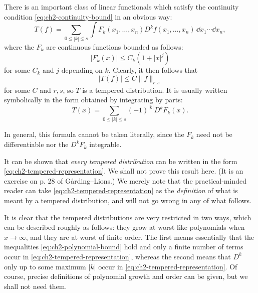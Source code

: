 There is an important class of linear functionals which satisfy the continuity
condition \eqref{eq:ch2-continuity-bound} in an obvious way:
\begin{equation}
  T(f)=\sum_{0\le|k|\le s}\int
  F_k(x_1,\ldots,x_n)D^kf(x_1,\ldots,x_n)\,\dd x_1\cdots \dd x_n,
\tag{2-11}\label{eq:ch2-tempered-representation}
\end{equation}
where the $F_k$ are continuous functions bounded as follows:
\begin{equation}
  |F_k(x)|\le C_k(1+|x|^j)
\tag{2-12}\label{eq:ch2-polynomial-bound}
\end{equation}
for some $C_k$ and $j$ depending on $k$. Clearly, it then follows that
\begin{equation*}
  |T(f)|\le C\|f\|_{r,s}
\end{equation*}
for some $C$ and $r,s$, so $T$ is a tempered distribution. It is usually
written symbolically in the form obtained by integrating by parts:
\begin{equation}
  T(x)=\sum_{0\le|k|\le s}(-1)^{|k|}D^kF_k(x).
\tag{2-13}\label{eq:ch2-integration-by-parts}
\end{equation}

In general, this formula cannot be taken literally, since the $F_k$ need not
be differentiable nor the $D^kF_k$ integrable.

It can be shown that \emph{every tempered distribution} can be written in the
form \eqref{eq:ch2-tempered-representation}. We shall not prove this result here. (It is an exercise on p. 28
of G\aa rding--Lions.) We merely note that the practical-minded reader can
take \eqref{eq:ch2-tempered-representation} as the \emph{definition} of what is meant by a tempered
distribution, and will not go wrong in any of what follows.

It is clear that the tempered distributions are very restricted in two ways,
which can be described roughly as follows: they grow at worst like polynomials
when $x\to\infty$, and they are at worst of finite order. The first means
essentially that the inequalities \eqref{eq:ch2-polynomial-bound} hold and only a finite number of terms
occur in \eqref{eq:ch2-tempered-representation}, whereas the second means that $D^k$ only up to some maximum
$|k|$ occur in \eqref{eq:ch2-tempered-representation}. Of course, precise definitions of polynomial growth
and order can be given, but we shall not need them.

